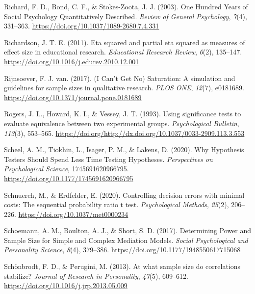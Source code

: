 \documentclass[
  english,
  ,jou, a4paper,floatsintext]{apa6}
\newlength{\cslhangindent}
\newenvironment{cslreferences}%
  {\setlength{\parindent}{0pt}%
  \everypar{\setlength{\hangindent}{\cslhangindent}}\ignorespaces}%
  {\par}
\begin{document}
\begin{cslreferences}
\leavevmode\hypertarget{ref-richard_one_2003}{}%
Richard, F. D., Bond, C. F., \& Stokes-Zoota, J. J. (2003). One Hundred Years of Social Psychology Quantitatively Described. \emph{Review of General Psychology}, \emph{7}(4), 331--363. \url{https://doi.org/10.1037/1089-2680.7.4.331}

\leavevmode\hypertarget{ref-richardson_eta_2011}{}%
Richardson, J. T. E. (2011). Eta squared and partial eta squared as measures of effect size in educational research. \emph{Educational Research Review}, \emph{6}(2), 135--147. \url{https://doi.org/10.1016/j.edurev.2010.12.001}

\leavevmode\hypertarget{ref-rijnsoever_i_2017}{}%
Rijnsoever, F. J. van. (2017). (I Can't Get No) Saturation: A simulation and guidelines for sample sizes in qualitative research. \emph{PLOS ONE}, \emph{12}(7), e0181689. \url{https://doi.org/10.1371/journal.pone.0181689}

\leavevmode\hypertarget{ref-rogers_using_1993}{}%
Rogers, J. L., Howard, K. I., \& Vessey, J. T. (1993). Using significance tests to evaluate equivalence between two experimental groups. \emph{Psychological Bulletin}, \emph{113}(3), 553--565. \url{https://doi.org/http://dx.doi.org/10.1037/0033-2909.113.3.553}

\leavevmode\hypertarget{ref-scheel_why_2020}{}%
Scheel, A. M., Tiokhin, L., Isager, P. M., \& Lakens, D. (2020). Why Hypothesis Testers Should Spend Less Time Testing Hypotheses. \emph{Perspectives on Psychological Science}, 1745691620966795. \url{https://doi.org/10.1177/1745691620966795}

\leavevmode\hypertarget{ref-schnuerch_controlling_2020}{}%
Schnuerch, M., \& Erdfelder, E. (2020). Controlling decision errors with minimal costs: The sequential probability ratio t test. \emph{Psychological Methods}, \emph{25}(2), 206--226. \url{https://doi.org/10.1037/met0000234}

\leavevmode\hypertarget{ref-schoemann_determining_2017}{}%
Schoemann, A. M., Boulton, A. J., \& Short, S. D. (2017). Determining Power and Sample Size for Simple and Complex Mediation Models. \emph{Social Psychological and Personality Science}, \emph{8}(4), 379--386. \url{https://doi.org/10.1177/1948550617715068}

\leavevmode\hypertarget{ref-schonbrodt_at_2013}{}%
Schönbrodt, F. D., \& Perugini, M. (2013). At what sample size do correlations stabilize? \emph{Journal of Research in Personality}, \emph{47}(5), 609--612. \url{https://doi.org/10.1016/j.jrp.2013.05.009}


\end{cslreferences}
\end{document}
